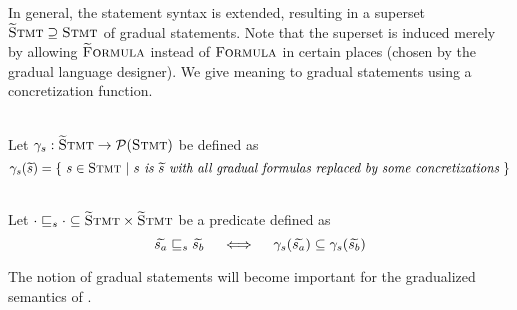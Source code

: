In general, the statement syntax is extended, resulting in a superset $\textup{\textsc{\ensuremath{\widetilde{\text{S}}}tmt}} \supseteq \textup{\textsc{Stmt}}$ of gradual statements.
Note that the superset is induced merely by allowing $\textup{\textsc{\ensuremath{\widetilde{\text{F}}}ormula}}$ instead of $\textup{\textsc{Formula}}$ in certain places (chosen by the gradual language designer).
We give meaning to gradual statements using a concretization function. %
\begin{definition}~\\
    Let $\gamma_s : \textup{\textsc{\ensuremath{\widetilde{\text{S}}}tmt}} \rightarrow \mathcal{P}(\textup{\textsc{Stmt}})$ be defined as
    \begin{displaymath}
    \gamma_s(\widetilde{s}) = \{~ s \in \textup{\textsc{Stmt}} ~|~ \textit{$s$ is $\widetilde{s}$ with all gradual formulas replaced by some concretizations} ~\}
    \end{displaymath}
\end{definition}
\begin{definition}~\\
    Let $\cdot \sqsubseteq_s \cdot \subseteq \textup{\textsc{\ensuremath{\widetilde{\text{S}}}tmt}} \times \textup{\textsc{\ensuremath{\widetilde{\text{S}}}tmt}}$ be a predicate defined as
    $$\widetilde{s_a} \sqsubseteq_s \widetilde{s_b}  \quad\iff\quad  \gamma_s(\widetilde{s_a}) \subseteq \gamma_s(\widetilde{s_b})$$
\end{definition}

The notion of gradual statements will become important for the gradualized semantics of \gvl.
